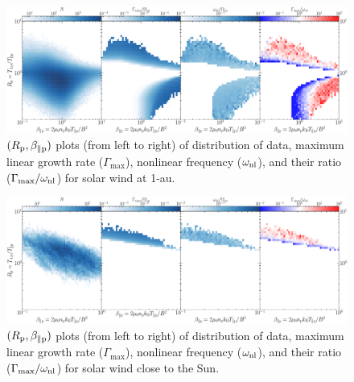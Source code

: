         \begin{figure}
            \begin{center}
                \includegraphics[width=1.\textwidth]{figures/chap7/wnd_brz_omega_gamma_mean.pdf}
                \caption[$(R_{\rm p}, \beta_{\parallel \rm p})$-plot of $\Gamma_{\max}$,
                $\omega_{\rm nl}$ and $\Gamma_{\max}/\omega_{\rm nl}$ for \texttt{wnd}
                dataset]{$(R_{\rm p}, \beta_{\parallel \rm p})$ plots (from left to right) of
                distribution of data, maximum linear growth rate ($\Gamma_{\max}$), nonlinear
                frequency ($\omega_{\rm nl}$), and their ratio ($\Gamma_{\max}/\omega_{\rm nl}$) for
                solar wind at 1-au.}
                \label{fig:ratio_brz_wnd}
            \end{center}
        \end{figure}

        \begin{figure}
            \begin{center}
                \includegraphics[width=1.\textwidth]{figures/chap7/psp_brz_omega_gamma_mean.pdf}
                \caption[$(R_{\rm p}, \beta_{\parallel \rm p})$-plot of $\Gamma_{\max}$,
                $\omega_{\rm nl}$ and $\Gamma_{\max}/\omega_{\rm nl}$ for \texttt{psp}
                dataset]{$(R_{\rm p}, \beta_{\parallel \rm p})$ plots (from left to right) of
                distribution of data, maximum linear growth rate ($\Gamma_{\max}$), nonlinear
                frequency ($\omega_{\rm nl}$), and their ratio ($\Gamma_{\max}/\omega_{\rm nl}$) for
                solar wind close to the Sun.}
                \label{fig:ratio_brz_psp}
            \end{center}
        \end{figure}

